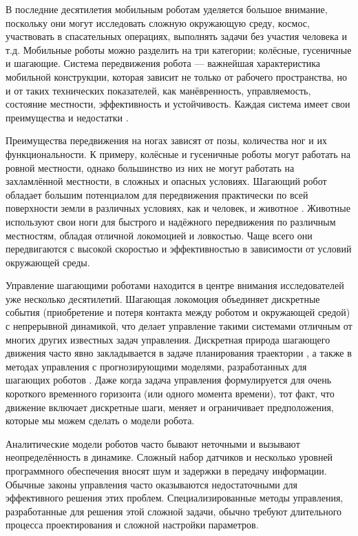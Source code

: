 {\actuality} 

В последние десятилетия мобильным роботам уделяется большое внимание, поскольку они могут исследовать сложную окружающую среду, космос, участвовать в спасательных операциях, выполнять задачи без участия человека и т.д. Мобильные роботы можно разделить на три категории; колёсные, гусеничные и шагающие. Система передвижения робота --- важнейшая характеристика мобильной конструкции, которая зависит не только от рабочего пространства, но и от таких технических показателей, как манёвренность, управляемость, состояние местности, эффективность и устойчивость. Каждая система имеет свои преимущества и недостатки \cite{zhong2019}.

Преимущества передвижения на ногах зависят от позы, количества ног и их функциональности. К примеру, колёсные и гусеничные роботы могут работать на ровной местности, однако большинство из них не могут работать на захламлённой местности, в сложных и опасных условиях. Шагающий робот обладает большим потенциалом для передвижения практически по всей поверхности земли в различных условиях, как и человек, и животное \cite{Silva2012}. Животные используют свои ноги для быстрого и надёжного передвижения по различным местностям, обладая отличной локомоцией и ловкостью. Чаще всего они передвигаются с высокой скоростью и эффективностью в зависимости от условий окружающей среды.

Управление шагающими роботами находится в центре внимания исследователей уже несколько десятилетий. Шагающая локомоция объединяет дискретные события (приобретение и потеря контакта между роботом и окружающей средой) с непрерывной динамикой, что делает управление такими системами отличным от многих других известных задач управления. Дискретная природа шагающего движения часто явно закладывается в задаче планирования траектории \cite{katayama2022whole, lu2023whole}, а также в методах управления с прогнозирующими моделями, разработанных для шагающих роботов \cite{KIM2019, chignoli2021humanoid}. Даже когда задача управления формулируется для очень короткого временного горизонта (или одного момента времени), тот факт, что движение включает дискретные шаги, меняет и ограничивает предположения, которые мы можем сделать о модели робота.

Аналитические модели роботов часто бывают неточными и вызывают неопределённость в динамике. Сложный набор датчиков и несколько уровней программного обеспечения вносят шум и задержки в передачу информации. Обычные законы управления часто оказываются недостаточными для эффективного решения этих проблем. Специализированные методы управления, разработанные для решения этой сложной задачи, обычно требуют длительного процесса проектирования и сложной настройки параметров. 

